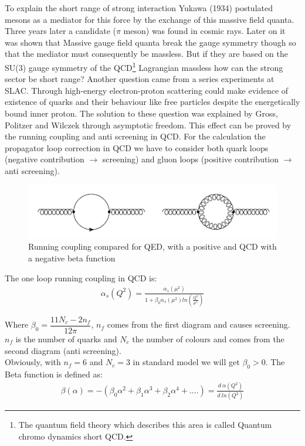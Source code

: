 To explain the short range of strong interaction Yukawa (1934) postulated mesons as a mediator for this force by the exchange of this massive field quanta. Three years later a candidate ($ \pi $ meson) was found in cosmic rays. Later on it was shown that Massive gauge field quanta break the gauge symmetry though so that the mediator must consequently be massless. But if they are based on the SU(3) gauge symmetry of the QCD\footnote{The quantum field theory which describes this area is called Quantum chromo dynamics short QCD.} Lagrangian massless how can the strong sector be short range? Another question came from a series experiments at SLAC. Through high-energy electron-proton scattering could make evidence of existence of quarks and their behaviour like free particles despite the energetically bound inner proton. The solution to these question was explained by Gross, Politzer
and Wilczek through asymptotic freedom. 
This effect can be proved by the running coupling and anti screening in QCD.
For the calculation the propagator loop correction in QCD we have to consider both quark loops (negative contribution $ \rightarrow $ screening) and gluon loops (positive contribution $ \rightarrow $ anti screening). 
\begin{figure}[h!]
\centering
\includegraphics[scale=0.7]{images/Intro/quarkGluonPop.png}
\caption{Running coupling compared for QED, with a positive and QCD with a negative beta function}
\end{figure}

The one loop running coupling in QCD is:
\begin{equation}
\begin{split}
\alpha_s(Q^2)= \frac{\alpha_s(\mu^2)}{1+\beta_0 \alpha_s(\mu^2) ln(\frac{Q^2}{\mu^2})}
\end{split}
\end{equation}

Where $ \beta_0 = \dfrac{11N_c -2n_f}{12\pi} $, $ n_f $ comes from the first diagram and causes screening.  $ n_f $ is the number of quarks and $ N_c $ the number of colours and comes from the second diagram (anti screening). \\
Obviously, with $ n_f = 6 $ and $ N_c = 3 $ in standard model we will get $ \beta_0 >0 $. The Beta function is defined as:
\begin{equation}
\begin{split}
\beta(\alpha)=-(\beta_0 \alpha^2 + \beta_1 \alpha^3+\beta_2\alpha^4+....)=\frac{d\:\alpha(Q^2)}{d \:ln(Q^2)}
\end{split}
\end{equation}


